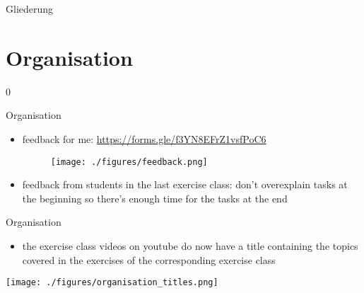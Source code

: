 \def\pascal{0}
\def\preview{1}









\begin{withoutheadline}
  \begin{withoutfootline}
    \begin{frame}
      \titlepagesecond
    \end{frame}
  \end{withoutfootline}

  \begin{frame}[shrink=10]{Gliederung}
    \tableofcontents[hideallsubsections]
  \end{frame}
\end{withoutheadline}

\setcounter{section}{-2}

\section{Organisation}

\if\pascal0{
  \begin{frame}{Organisation}
    \begin{itemize}
      \item \alert{feedback for me:} \url{https://forms.gle/f3YN8EFrZ1vsfPoC6}
      \begin{figure}
        \centering
        \texttt{[image: ./figures/feedback.png]}
      \end{figure}
      \item \alert{feedback from students in the last exercise class:} don't overexplain tasks at the beginning so there's enough time for the tasks at the end
    \end{itemize}
  \end{frame}
  \begin{frame}[allowframebreaks]{Organisation}
    \begin{itemize}
      \item the exercise class videos on youtube do now have a title containing the topics covered in the exercises of the corresponding exercise class
    \end{itemize}
    \texttt{[image: ./figures/organisation\_titles.png]}
  \end{frame}
}\fi

